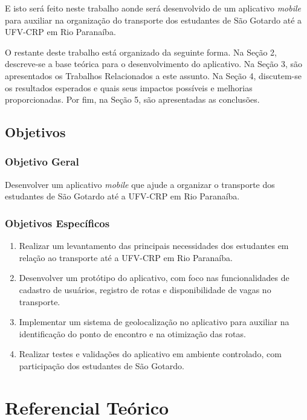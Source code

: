 \documentclass[
    12pt,                   %
    openright,              %
    oneside,                %
    a4paper,                %
    sumario=tradicional,    %
    english,                %
    brazil,                 %
    ]{abntex2}
\begin{document}
    E isto será feito neste trabalho aonde será desenvolvido de um aplicativo \textit{mobile} para auxiliar na organização do transporte dos estudantes de São Gotardo até a UFV-CRP em Rio Paranaíba.
    
    O restante deste trabalho está organizado da seguinte forma. Na Seção 2, descreve-se a base teórica para o desenvolvimento do aplicativo. Na Seção 3, são apresentados os Trabalhos Relacionados a este assunto. Na Seção 4, discutem-se os resultados esperados e quais seus impactos possíveis e melhorias proporcionadas. Por fim, na Seção 5, são apresentadas as conclusões.

    \section{Objetivos}\label{sec:objetivos}
        \label{sec:Objetivos}
        \subsection{Objetivo Geral}\label{sec:ObjetivosEspec}
            Desenvolver um aplicativo \textit{mobile} que ajude a organizar o transporte dos estudantes de São Gotardo até a UFV-CRP em Rio Paranaíba.
    
        \subsection{Objetivos Específicos}\label{sec:ObjetivosEspec}
            \begin{enumerate}
                \item Realizar um levantamento das principais necessidades dos estudantes em relação ao transporte até a UFV-CRP em Rio Paranaíba.
                \item Desenvolver um protótipo do aplicativo, com foco nas funcionalidades de cadastro de usuários, registro de rotas e disponibilidade de vagas no transporte.
                \item Implementar um sistema de geolocalização no aplicativo para auxiliar na identificação do ponto de encontro e na otimização das rotas.
                \item Realizar testes e validações do aplicativo em ambiente controlado, com participação dos estudantes de São Gotardo.
            \end{enumerate}


\chapter{Referencial Teórico}\label{sec:RefTeorico}
\end{document}

